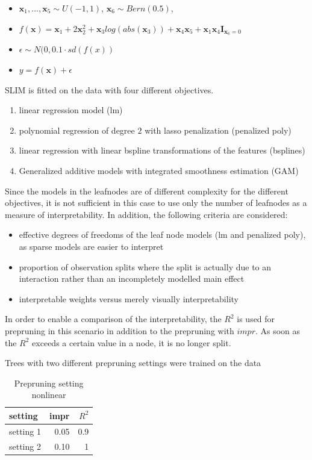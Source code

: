 \begin{itemize}
    \item $\textbf{x}_1, ..., \textbf{x}_5 \sim U(-1,1)$, $\textbf{x}_6 \sim Bern(0.5)$, 
    \item $ f(\textbf{x}) = \textbf{x}_1 + 2 \textbf{x}_2^2 + \textbf{x}_3log(abs(\textbf{x}_3)) + \textbf{x}_4\textbf{x}_5 + \textbf{x}_1\textbf{x}_4\mathbf{I}_{\textbf{x}_6 = 0}$
    \item $\epsilon \sim N(0,  0.1 \cdot sd(f(x))$
    \item $y = f(\textbf{x}) + \epsilon$     
\end{itemize}

SLIM is fitted on the data with four different objectives.
\begin{enumerate}
    \item linear regression model (lm)
    \item polynomial regression of degree $2$ with lasso penalization (penalized poly)
    \item linear regression with linear bspline transformations of the features (bsplines)
    \item Generalized additive models with integrated smoothness estimation \citep{Wood.2011} (GAM)
\end{enumerate}


Since the models in the leafnodes are of different complexity for the different objectives, it is not sufficient in this case to use only the number of leafnodes as a measure of interpretability. In addition, the following criteria are considered:
\begin{itemize}
    \item effective degrees of freedoms of the leaf node models (lm and penalized poly), as sparse models are easier to interpret
    \item proportion of observation splits where the split is actually due to an interaction rather than an incompletely modelled main effect
    \item interpretable weights versus merely visually interpretability
\end{itemize}

In order to enable a comparison of the interpretability, the $R^2$ is used for prepruning in this scenario in addition to the prepruning with $impr$. As soon as the $R^2$ exceeds a certain value in a node, it is no longer split. 

Trees with two different prepruning settings were trained on the data
\begin{table}[!htt]
    \centering
    \begin{tabular}{l|r|r}
        \hline
        setting  &  impr & $R^2$ \\
        \hline
        setting 1 & 0.05 & 0.9 \\
        setting 2 & 0.10 & 1  \\
        \hline

    \end{tabular}
    \caption{Prepruning setting nonlinear}
\end{table}

